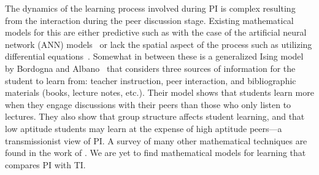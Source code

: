 \documentclass[twocolumn,secnumarabic,amssymb, nobibnotes, aps, prd]{revtex4-2}
\begin{document}
    The dynamics of the learning process involved during PI is complex resulting from the interaction during the peer discussion stage.
    Existing mathematical models for this are either predictive such as with the case of the artificial neural network (ANN) models~\cite{roxas2010seating,monterola2009} or lack the spatial aspect of the process such as utilizing differential equations~\cite{pritchard2008mathematical,nitta2019mathematical}.
    Somewhat in between these is a generalized Ising model by Bordogna and Albano~\cite{bordogna2001theoretical,bordogna2003simulation} that considers three sources of information for the student to learn from: teacher instruction, peer interaction, and bibliographic materials (books, lecture notes, etc.).
    Their model shows that students learn more when they engage discussions with their peers than those who only listen to lectures.
    They also show that group structure affects student learning, and that low aptitude students may learn at the expense of high aptitude peers---a transmissionist view of PI.
    A survey of many other mathematical techniques are found in the work of \citet{nitta2019mathematical}.
    We are yet to find mathematical models for learning that compares PI with TI.
    
\end{document}
